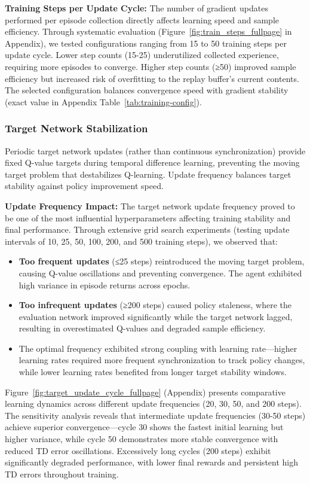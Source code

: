 \textbf{Training Steps per Update Cycle:} The number of gradient updates performed per episode collection directly affects learning speed and sample efficiency. Through systematic evaluation (Figure~\ref{fig:train_steps_fullpage} in Appendix), we tested configurations ranging from 15 to 50 training steps per update cycle. Lower step counts (15-25) underutilized collected experience, requiring more episodes to converge. Higher step counts (≥50) improved sample efficiency but increased risk of overfitting to the replay buffer's current contents. The selected configuration balances convergence speed with gradient stability (exact value in Appendix Table~\ref{tab:training-config}).

\subsubsection{Target Network Stabilization}

Periodic target network updates (rather than continuous synchronization) provide fixed Q-value targets during temporal difference learning, preventing the moving target problem that destabilizes Q-learning. Update frequency balances target stability against policy improvement speed.

\textbf{Update Frequency Impact:} The target network update frequency proved to be one of the most influential hyperparameters affecting training stability and final performance. Through extensive grid search experiments (testing update intervals of 10, 25, 50, 100, 200, and 500 training steps), we observed that:
\begin{itemize}
    \item \textbf{Too frequent updates} (≤25 steps) reintroduced the moving target problem, causing Q-value oscillations and preventing convergence. The agent exhibited high variance in episode returns across epochs.
    \item \textbf{Too infrequent updates} (≥200 steps) caused policy staleness, where the evaluation network improved significantly while the target network lagged, resulting in overestimated Q-values and degraded sample efficiency.
    \item The optimal frequency exhibited strong coupling with learning rate—higher learning rates required more frequent synchronization to track policy changes, while lower learning rates benefited from longer target stability windows.
\end{itemize}

Figure~\ref{fig:target_update_cycle_fullpage} (Appendix) presents comparative learning dynamics across different update frequencies (20, 30, 50, and 200 steps). The sensitivity analysis reveals that intermediate update frequencies (30-50 steps) achieve superior convergence—cycle 30 shows the fastest initial learning but higher variance, while cycle 50 demonstrates more stable convergence with reduced TD error oscillations. Excessively long cycles (200 steps) exhibit significantly degraded performance, with lower final rewards and persistent high TD errors throughout training.

